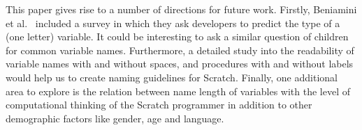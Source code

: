 \documentclass[conference]{IEEEtran}
\begin{document}
This paper gives rise to a number of directions for future work. Firstly, Beniamini et al.~\cite{Beniamini} included a survey in which they ask developers to predict the type of a (one letter) variable. It could be interesting to ask a similar question of children for common variable names. Furthermore, a detailed study into the readability of variable names with and without spaces, and procedures with and without labels would help us to create naming guidelines for Scratch. Finally, one additional area to explore is the relation between name length of variables with the level of computational thinking of the Scratch programmer in addition to other demographic factors like gender, age and language.  






%

\end{document}
